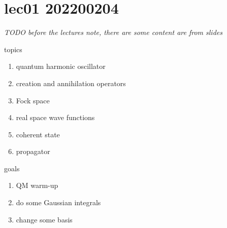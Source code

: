\chapter{lec01 202200204}

\emph{TODO before the lectures note, there are some content are from slides}

topics
\begin{enumerate}
    \item quantum harmonic oscillator
    \item creation and annihilation operators
    \item Fock space
    \item real space wave functions
    \item coherent state
    \item propagator
\end{enumerate}

goals
\begin{enumerate}
    \item QM warm-up
    \item do some Gaussian integrals
    \item change some basis
\end{enumerate}

